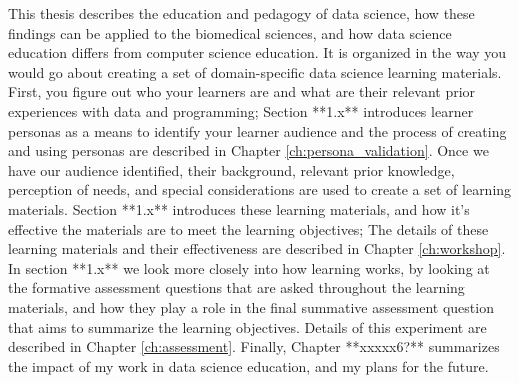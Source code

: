 \documentclass[010-intro.tex]{subfiles}
\begin{document}
This thesis describes the education and pedagogy of data science,
how these findings can be applied to the biomedical sciences,
and how data science education differs from computer science education.
It is organized in the way you would go about creating a set of domain-specific data science learning materials.
First, you figure out who your learners are and what are their relevant prior experiences with
data and programming;
Section **1.x** introduces learner personas as a means to identify your learner audience
and the process of creating and using personas are described in Chapter \ref{ch:persona_validation}.
Once we have our audience identified,
their background, relevant prior knowledge, perception of needs, and special considerations
are used to create a set of learning materials.
Section **1.x** introduces these learning materials,
and how it's effective the materials are to meet the learning objectives;
The details of these learning materials and their effectiveness are described in Chapter \ref{ch:workshop}.
In section **1.x** we look more closely into how learning works,
by looking at the formative assessment questions that are asked throughout the learning materials,
and how they play a role in the final summative assessment question that aims to summarize the learning objectives.
Details of this experiment are described in Chapter \ref{ch:assessment}.
Finally, Chapter **xxxxx6?** summarizes the impact of my work in data science education,
and my plans for the future.
\end{document}

